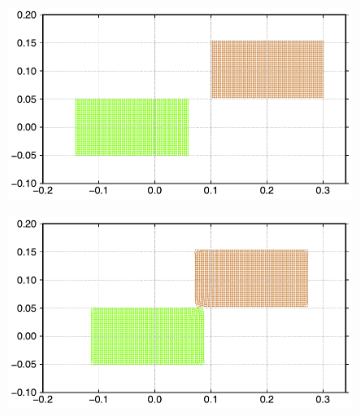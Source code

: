 \begin{figure}[!htpb]
  \centering
  \begin{subfigure}{0.48\textwidth}
    \centering
    \includegraphics[width=1.0\textwidth]{figures/csph/figures/dinesh_2022_elastic_solids_passing_by/CTVF/time0}
    \label{fig:passing-0}
  \end{subfigure}
  \begin{subfigure}{0.48\textwidth}
    \centering
    \includegraphics[width=1.0\textwidth]{figures/csph/figures/dinesh_2022_elastic_solids_passing_by/CTVF/time1}
    \label{fig:passing-1}
  \end{subfigure}


\end{figure}
